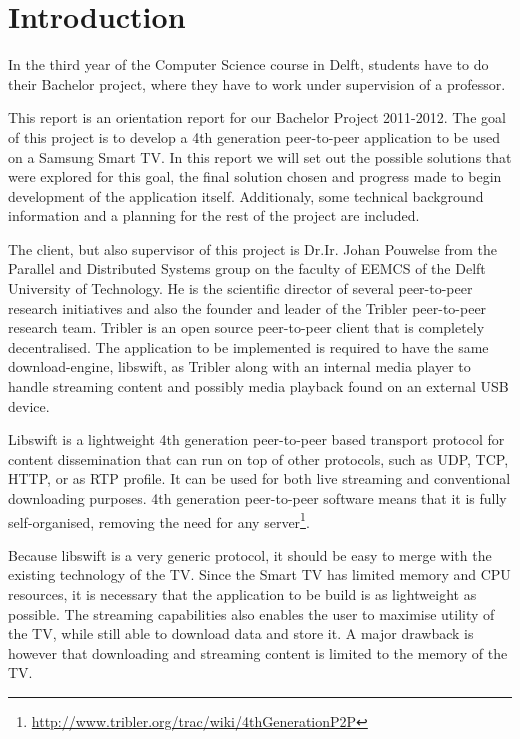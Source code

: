 \chapter{Introduction}

In the third year of the Computer Science course in Delft, students have to do their Bachelor project, 
where they have to work under supervision of a professor.

This report is an orientation report for our Bachelor Project 2011-2012.
The goal of this project is to develop a 4th generation peer-to-peer application to be used on a Samsung Smart TV.
In this report we will set out the possible solutions that were explored for this goal,
the final solution chosen and progress made to begin development of the application itself.
Additionaly, some technical background information and a planning for the rest of the project are included.

The client, but also supervisor of this project is Dr.Ir. Johan Pouwelse from the Parallel and Distributed Systems group on the faculty of EEMCS of the Delft University of Technology.
He is the scientific director of several peer-to-peer research initiatives and also the founder and leader of the Tribler peer-to-peer research team.
Tribler is an open source peer-to-peer client that is completely decentralised.
The application to be implemented is required to have the same download-engine, libswift, as Tribler 
along with an internal media player to handle streaming content and possibly media playback found on an external USB device.

Libswift is a lightweight 4th generation peer-to-peer based transport protocol for content dissemination
that can run on top of other protocols, such as UDP, TCP, HTTP, or as RTP profile.
It can be used for both live streaming and conventional downloading purposes.
4th generation peer-to-peer software means that it is fully self-organised, removing the need for any server\footnote{\url{http://www.tribler.org/trac/wiki/4thGenerationP2P}}.

Because libswift is a very generic protocol, it should be easy to merge with the existing technology of the TV.
Since the Smart TV has limited memory and CPU resources, 
it is necessary that the application to be build is as lightweight as possible.
The streaming capabilities also enables the user to maximise utility of the TV,
while still able to download data and store it.
A major drawback is however that downloading and streaming content is limited to the memory of the TV.
